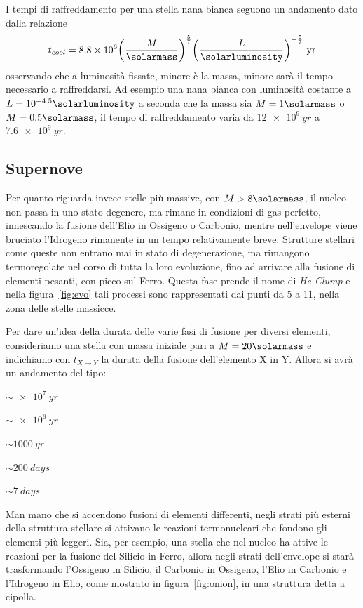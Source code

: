 I tempi di raffreddamento per una stella nana bianca seguono un andamento dato dalla relazione
\begin{equation}
    t_{cool} = 8.8\times 10^6 {\left(\frac{M}{\si{\solarmass}} \right)}^{\frac{5}{7}} {\left( \frac{L}{\si{\solarluminosity}} \right)}^{-\frac{5}{7}} \mbox{ yr}
\end{equation}
osservando che a luminosità fissate, minore è la massa, minore sarà il tempo necessario a raffreddarsi. Ad esempio una nana bianca con luminosità costante a $L = 10^{-4.5} \si{\solarluminosity}$ a seconda che la massa sia $M = 1\si{\solarmass}$ o $M = 0.5 \si{\solarmass}$, il tempo di raffreddamento varia da $\SI{12e9}{yr}$ a $\SI{7.6e9}{yr}$.

\subsection{Supernove}\label{sec:supernove}
Per quanto riguarda invece stelle più massive, con $M > 8 \si{\solarmass}$, il nucleo non passa in uno stato degenere, ma rimane in condizioni di gas perfetto, innescando la fusione dell'Elio in Ossigeno o Carbonio, mentre nell'envelope viene bruciato l'Idrogeno rimanente in un tempo relativamente breve. Strutture stellari come queste non entrano mai in stato di degenerazione, ma rimangono termoregolate nel corso di tutta la loro evoluzione, fino ad arrivare alla fusione di elementi pesanti, con picco sul Ferro. Questa fase prende il nome di \textit{He Clump} e nella figura~\ref{fig:evo} tali processi sono rappresentati dai punti da 5 a 11, nella zona delle stelle massicce.

Per dare un'idea della durata delle varie fasi di fusione per diversi elementi, consideriamo una stella con massa iniziale pari a $M = 20\si{\solarmass}$ e indichiamo con $t_{X \rightarrow Y}$ la durata della fusione dell'elemento X in Y. Allora si avrà un andamento del tipo:
\begin{description}
    \centering
    \item[$t_{H \rightarrow He}$] $\sim \SI{e7}{yr}$
    \item[$t_{He \rightarrow C}$] $\sim \SI{e6}{yr}$
    \item[$t_{C \rightarrow O}$] $\sim \SI{1000}{yr}$
    \item[$t_{O}$] $\sim \SI{200}{days}$
    \item[$t_{Si}$] $\sim \SI{7}{days}$
\end{description}

Man mano che si accendono fusioni di elementi differenti, negli strati più esterni della struttura stellare si attivano le reazioni termonucleari che fondono gli elementi più leggeri. Sia, per esempio, una stella che nel nucleo ha attive le reazioni per la fusione del Silicio in Ferro, allora negli strati dell'envelope si starà trasformando l'Ossigeno in Silicio, il Carbonio in Ossigeno, l'Elio in Carbonio e l'Idrogeno in Elio, come mostrato in figura~\ref{fig:onion}, in una struttura detta a cipolla.


